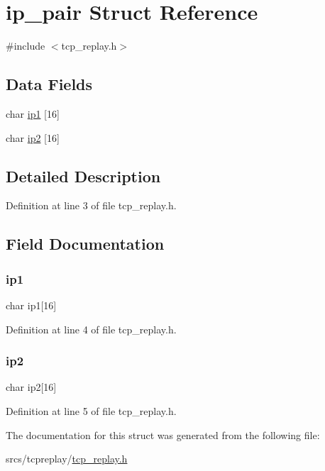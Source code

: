 \hypertarget{structip__pair}{}\section{ip\+\_\+pair Struct Reference}
\label{structip__pair}


{\ttfamily \#include $<$tcp\+\_\+replay.\+h$>$}

\subsection*{Data Fields}
\begin{DoxyCompactItemize}
\item 
char \hyperlink{structip__pair_ad6baab26d5c4fe971fd304e766794dac}{ip1} \mbox{[}16\mbox{]}
\item 
char \hyperlink{structip__pair_a602d32c6abb71ba2847e74b7f3c40267}{ip2} \mbox{[}16\mbox{]}
\end{DoxyCompactItemize}


\subsection{Detailed Description}


Definition at line 3 of file tcp\+\_\+replay.\+h.



\subsection{Field Documentation}
\mbox{\label{structip__pair_ad6baab26d5c4fe971fd304e766794dac}} 
\subsubsection{\texorpdfstring{ip1}{ip1}}
{\footnotesize\ttfamily char ip1\mbox{[}16\mbox{]}}



Definition at line 4 of file tcp\+\_\+replay.\+h.

\mbox{\label{structip__pair_a602d32c6abb71ba2847e74b7f3c40267}} 
\subsubsection{\texorpdfstring{ip2}{ip2}}
{\footnotesize\ttfamily char ip2\mbox{[}16\mbox{]}}



Definition at line 5 of file tcp\+\_\+replay.\+h.



The documentation for this struct was generated from the following file\+:\begin{DoxyCompactItemize}
\item 
srcs/tcpreplay/\hyperlink{tcp__replay_8h}{tcp\+\_\+replay.\+h}\end{DoxyCompactItemize}
